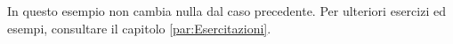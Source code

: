 In questo esempio non cambia nulla dal caso precedente. 
Per ulteriori esercizi ed esempi, consultare il capitolo \ref{par:Esercitazioni}.
\newpage




 


